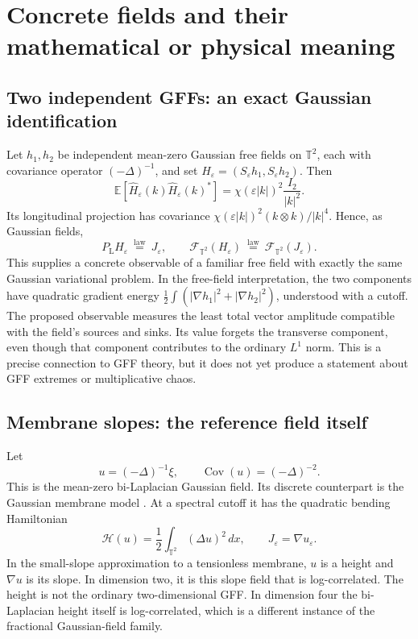 \documentclass[11pt]{article}
\theoremstyle{definition}
\newcommand{\E}{\mathbb E}
\newcommand{\T}{\mathbb T}
\newcommand{\Cov}{\operatorname{Cov}}
\newcommand{\cF}{\mathcal F}
\newcommand{\PL}{P_{\mathrm L}}
\newcommand{\dd}{\,dx}
\begin{document}
\section{Concrete fields and their mathematical or physical meaning}
\label{sec:examples}

\subsection{Two independent GFFs: an exact Gaussian identification}
Let $h_1,h_2$ be independent mean-zero Gaussian free fields on $\T^2$,
each with covariance operator $(-\Delta)^{-1}$, and set
$H_\varepsilon=(S_\varepsilon h_1,S_\varepsilon h_2)$. Then
\[
  \E[\widehat H_\varepsilon(k)\widehat H_\varepsilon(k)^*]
  =\chi(\varepsilon|k|)^2\frac{I_2}{|k|^2}.
\]
Its longitudinal projection has covariance
$\chi(\varepsilon|k|)^2(k\otimes k)/|k|^4$. Hence, as Gaussian fields,
\begin{equation}\label{eq:vectorgff}
  \PL H_\varepsilon\ \stackrel{\mathrm{law}}=\ J_\varepsilon,
  \qquad
  \cF_{\T^2}(H_\varepsilon)
     \ \stackrel{\mathrm{law}}=\ \cF_{\T^2}(J_\varepsilon).
\end{equation}
This supplies a concrete observable of a familiar free field with
exactly the same Gaussian variational problem. In the free-field
interpretation, the two components have quadratic gradient energy
$\frac12\int(|\nabla h_1|^2+|\nabla h_2|^2)$, understood with a cutoff.
The proposed observable measures the least total vector amplitude
compatible with the field's sources and sinks. Its value forgets the
transverse component, even though that component contributes to the
ordinary $L^1$ norm. This is a precise connection to GFF theory, but it
does not yet produce a statement about GFF extremes or multiplicative
chaos.

\subsection{Membrane slopes: the reference field itself}
Let
\[
  u=(-\Delta)^{-1}\xi,
  \qquad \Cov(u)=(-\Delta)^{-2}.
\]
This is the mean-zero bi-Laplacian Gaussian field. Its discrete
counterpart is the Gaussian membrane model \cite{LSSW}. At a spectral
cutoff it has the quadratic bending Hamiltonian
\begin{equation}\label{eq:membrane}
  \mathcal H(u)=\frac12\int_{\T^2}(\Delta u)^2\dd,
  \qquad J_\varepsilon=\nabla u_\varepsilon.
\end{equation}
In the small-slope approximation to a tensionless membrane, $u$ is a
height and $\nabla u$ is its slope. In dimension two, it is this slope
field that is log-correlated. The height is not the ordinary
two-dimensional GFF. In dimension four the bi-Laplacian height itself
is log-correlated, which is a different instance of the fractional
Gaussian-field family.
\end{document}
